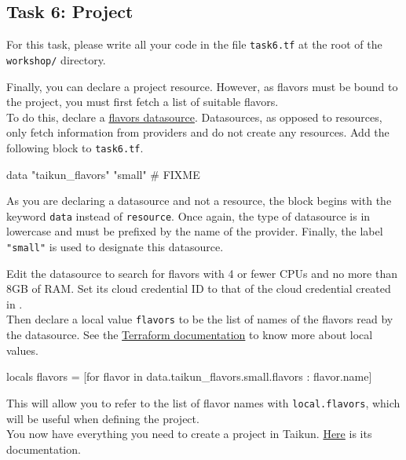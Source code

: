 \subsection{Task 6: Project}\label{sec:task6}

\begin{note}
For this task, please write all your code in the file \texttt{task6.tf}
at the root of the \texttt{workshop/} directory.
\end{note}

Finally, you can declare a project resource.
However, as flavors must be bound to the project,
you must first fetch a list of suitable flavors.\\

To do this, declare a \href{https://registry.terraform.io/providers/itera-io/taikun/latest/docs/data-sources/flavors}{flavors datasource}.
Datasources, as opposed to resources, only fetch information from providers and do not create any resources.
Add the following block to \texttt{task6.tf}.
\begin{tf}
data "taikun_flavors" "small" {
  # FIXME
}
\end{tf}

\begin{tip}
As you are declaring a datasource and not a resource, the block begins with the keyword \texttt{data} instead of \texttt{resource}.
Once again, the type of datasource is in lowercase and must be prefixed by the name of the provider.
Finally, the label \texttt{"small"} is used to designate this datasource.
\end{tip}

Edit the datasource to search for flavors with 4 or fewer CPUs and no more than 8GB of RAM.
Set its cloud credential ID to that of the cloud credential created in .\\

Then declare a local value \texttt{flavors} to be the list of names of the flavors read
by the datasource.
See the \href{https://www.terraform.io/docs/language/values/locals.html}{Terraform documentation}
to know more about local values.
\begin{tf}
locals {
  flavors = [for flavor in data.taikun_flavors.small.flavors : flavor.name]
}
\end{tf}
This will allow you to refer to the list of flavor names with \texttt{local.flavors},
which will be useful when defining the project.\\

You now have everything you need to create a project in Taikun.
\href{https://registry.terraform.io/providers/itera-io/taikun/latest/docs/resources/project}{Here} is its documentation.\\

